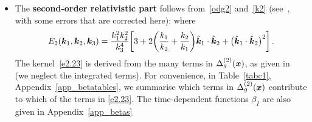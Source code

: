 {{{\begin{itemize}
\item
The {\bfseries second-order relativistic part} follows from~\eqref{odg2} and~\eqref{k2} (see~\cite{Jolicoeur:2017eyi}, with some errors that are corrected here):
where
\begin{equation}
E_{2}(\bm{k}_{1}, \bm{k}_{2},\bm{k}_3)=\frac{k_{1}^{2}k_{2}^{2}}{k_{3}^{4}}
\bigg[3+2\bigg(\frac{k_{1}}{k_{2}} + \frac{k_{2}}{k_{1}}\bigg) \hat{\k}_1\cdot \hat{\k}_2 + \big( \hat{\k}_1\cdot \hat{\k}_2\big)^2\bigg]\,. %
\end{equation}
The kernel~\eqref{e2.23} is derived from the many terms in $\Delta_g^{(2)}(\bm {x})$, as given in~\cite{Bertacca:2014dra, Bertacca:2014hwa} (we neglect the integrated terms). For convenience, in Table~\ref{tabc1},  Appendix~\ref{app_betatables},  we summarise  which terms in $\Delta_g^{(2)}(\bm {x})$ contribute to which of the terms in  \eqref{e2.23}. The time-dependent functions $\beta_{I}$ are also given in Appendix~\ref{app_betas}
 

\end{itemize}}}}
